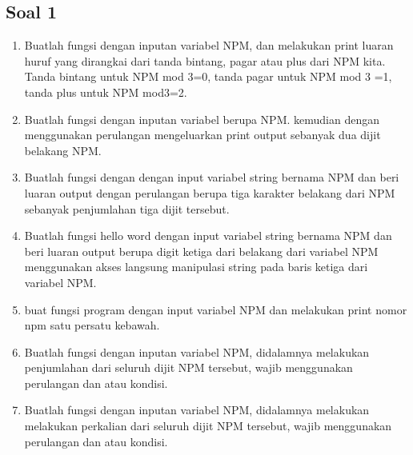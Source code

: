 \subsection{Soal 1}
\begin{enumerate}
    \item Buatlah fungsi dengan inputan variabel NPM, dan melakukan print luaran huruf yang dirangkai dari tanda bintang, pagar atau plus dari NPM kita. Tanda bintang untuk NPM mod 3=0, tanda pagar untuk NPM mod 3 =1, tanda plus untuk NPM mod3=2.
    

    \item Buatlah fungsi dengan inputan variabel berupa NPM. kemudian dengan menggunakan perulangan mengeluarkan print output sebanyak dua dijit belakang NPM.
    

    \item Buatlah fungsi dengan dengan input variabel string bernama NPM dan beri luaran output dengan perulangan berupa tiga karakter belakang dari NPM sebanyak penjumlahan tiga dijit tersebut.
    

    \item Buatlah fungsi hello word dengan input variabel string bernama NPM dan beri luaran output berupa digit ketiga dari belakang dari variabel NPM menggunakan akses langsung manipulasi string pada baris ketiga dari variabel NPM.
    

    \item buat fungsi program dengan input variabel NPM dan melakukan print nomor npm satu persatu kebawah.
    

    \item Buatlah fungsi dengan inputan variabel NPM, didalamnya melakukan penjumlahan dari seluruh dijit NPM tersebut, wajib menggunakan perulangan dan atau kondisi.
        

    \item Buatlah fungsi dengan inputan variabel NPM, didalamnya melakukan melakukan perkalian dari seluruh dijit NPM tersebut, wajib menggunakan perulangan dan atau kondisi.
        


\end{enumerate}
